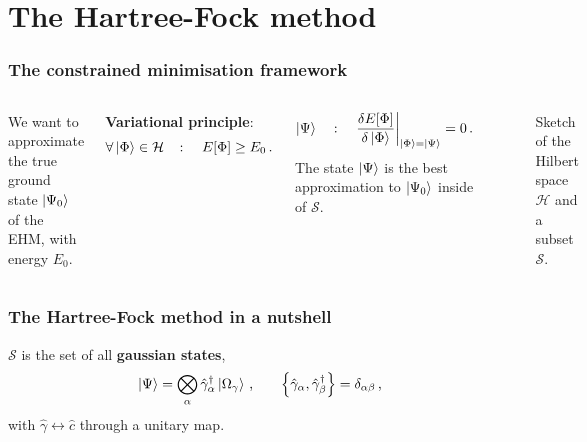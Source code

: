 \def\SectionFolder{sections/hf}
\section{The Hartree-Fock method}

\begin{frame}
	\frametitle{The constrained minimisation framework}
	\begin{columns}
		We want to approximate the true ground state $\ket{\Psi_0}$ of the EHM, with energy $E_0$.\medskip
		
		\textbf{Variational principle}:
		\[
			\forall \ket{\Phi} \in \mathcal{H} \quad\colon\quad
			E[\Phi] \ge E_0 \, \text{.}
		\]
		\DownImplication
		\begin{tabbox}[frametitle=Constrained minimisation procedure]
			\[
				\ket{\Psi} \quad\colon\quad
				\fdv{E[\Phi]}{\ket{\Phi}} \bigg|_{\ket{\Phi} = \ket{\Psi}} = 0 \, \text{.}
			\]
			The state $\ket{\Psi}$ is the best approximation to $\ket{\Psi_0}$ inside of $\mathcal{S}$.
		\end{tabbox}		
		\begin{figure}
			\centering
			\resizebox{\columnwidth}{!}{
			
			}
			\label{fig:H-S}
			\caption{Sketch of the Hilbert space $\mathcal{H}$ and a subset $\mathcal{S}$.}
		\end{figure}
	\end{columns}
\end{frame}

\begin{frame}
	\frametitle{The Hartree-Fock method in a nutshell}
	
	\begin{tabbox}[frametitle=The Hartree-Fock subspace of states] 
		$\mathcal{S}$ is the set of all \textbf{gaussian states},
		\[
		\ket{\Psi} = \bigotimes_\alpha \hat \gamma_\alpha^\dagger \ket{\Omega_\gamma} \, \text{,}
		\qquad
		\acomm{\hat \gamma_\alpha}{\hat \gamma_\beta^\dagger} = \delta_{\alpha\beta} \, \text{,}
		\]
		with $\hat \gamma \leftrightarrow \hat c$ through a unitary map.
	\end{tabbox}
	

\end{frame}

